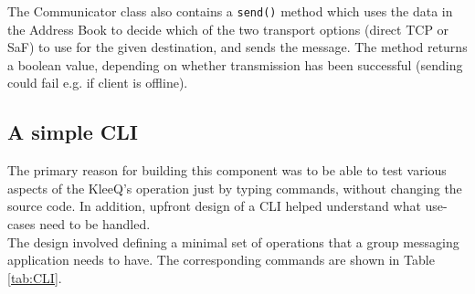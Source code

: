 \documentclass[a4paper, 12pt]{report}
\begin{document}
The Communicator class also contains a \texttt{send()} method which uses the data in the Address Book to decide which of the two transport options (direct TCP or SaF) to use for the given destination, and sends the message. The method returns a boolean value, depending on whether transmission has been successful (sending could fail e.g. if client is offline).


\subsection{A simple CLI}
\label{subsec:impl.prep.CLI}
The primary reason for building this component was to be able to test various aspects of the KleeQ's operation just by typing commands, without changing the source code. In addition, upfront design of a CLI helped understand what use-cases need to be handled. \\

The design involved defining a minimal set of operations that a group messaging application needs to have. The corresponding commands are shown in Table \ref{tab:CLI}.
\end{document}

